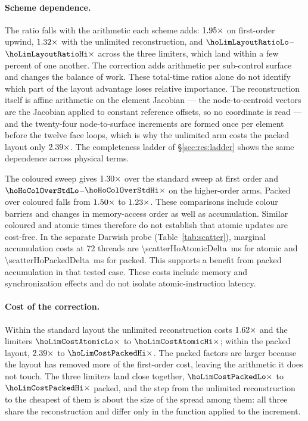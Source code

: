 \documentclass[sigconf,nonacm]{acmart}
\begin{document}
\paragraph{Scheme dependence.} The ratio falls with the arithmetic each scheme adds:
$1.95\times$ on first-order upwind, $1.32\times$ with the unlimited
reconstruction, and $\hoLimLayoutRatioLo$--$\hoLimLayoutRatioHi\times$ across the three limiters,
which land within a few percent of one another. The correction adds arithmetic per
sub-control surface and changes the balance of work. These total-time ratios alone
do not identify which part of the layout advantage loses relative importance. The reconstruction itself is affine arithmetic on the element Jacobian --- the
node-to-centroid vectors are the Jacobian applied to constant reference offsets, so no coordinate
is read --- and the twenty-four node-to-surface increments are formed once per element before
the twelve face loops, which is why the unlimited arm costs the packed layout only
$2.39\times$. The completeness ladder of \S\ref{sec:res:ladder} shows the same dependence across
physical terms.

The coloured sweep gives $1.30\times$ over the standard sweep at
first order and $\hoHoColOverStdLo$--$\hoHoColOverStdHi\times$ on the higher-order
arms. Packed over coloured falls from $1.50\times$ to
$1.23\times$. These comparisons include colour barriers and
changes in memory-access order as well as accumulation. Similar coloured and
atomic times therefore do not establish that atomic updates are cost-free.
In the separate Darwish probe (Table~\ref{tab:scatter}), marginal accumulation
costs at 72 threads are \SI{\scatterHoAtomicDelta}{\milli\second} for atomic
and \SI{\scatterHoPackedDelta}{\milli\second} for packed. This supports a benefit
from packed accumulation in that tested case. These costs include memory and
synchronization effects and do not isolate atomic-instruction latency.

\paragraph{Cost of the correction.} Within the standard layout the unlimited reconstruction costs
$1.62\times$ and the limiters $\hoLimCostAtomicLo\times$ to
$\hoLimCostAtomicHi\times$; within the packed layout, $2.39\times$ to
$\hoLimCostPackedHi\times$. The packed factors are larger because the layout has removed more of
the first-order cost, leaving the arithmetic it does not touch. The three limiters land close
together, $\hoLimCostPackedLo\times$ to $\hoLimCostPackedHi\times$ packed, and the step from the
unlimited reconstruction to the cheapest of them is about the size of the spread among them: all
three share the reconstruction and differ only in the function applied to the increment.
\end{document}
